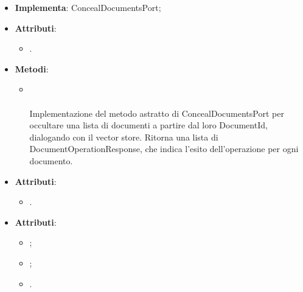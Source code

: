 \documentclass[10pt, a4paper]{article}
\begin{document}
\label{ConcealDocumentsVectorStoreDettaglio}
\begin{itemize}
    \item \textbf{Implementa}: ConcealDocumentsPort;
    \item \textbf{Attributi}:
    \begin{itemize}
        \item {}.
    \end{itemize}
    \item \textbf{Metodi}:
    \begin{itemize}
        \item {}\\ \\
        Implementazione del metodo astratto di ConcealDocumentsPort per occultare una lista di documenti a partire dal loro DocumentId, dialogando con il vector store. Ritorna una lista di DocumentOperationResponse, che indica l'esito dell'operazione per ogni documento.
    \end{itemize}
\end{itemize}

\label{DocumentIdDettaglio}
\begin{itemize}
    \item \textbf{Attributi}:
    \begin{itemize}
        \item {}.
    \end{itemize}
\end{itemize}

\label{DocumentOperationResponseDettaglio}
\begin{itemize}
    \item \textbf{Attributi}:
    \begin{itemize}
        \item {};
        \item {};
        \item {}.
    \end{itemize}
\end{itemize}
\end{document}
